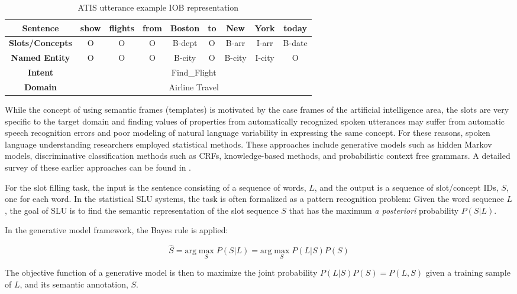 \begin{table}
\begin{tabular}{|c|c|c|c|c|c|c|c|c|}
\hline
{\bf Sentence} & show & flights & from & Boston & to & New & York & today \\
\hline
{\bf Slots/Concepts} & O & O & O & B-dept & O & B-arr & I-arr & B-date \\
\hline
{\bf Named Entity} & O & O & O & B-city & O & B-city & I-city & O \\
\hline
{\bf Intent} & \multicolumn{8}{c|}{Find\_Flight} \\
\hline
{\bf Domain} & \multicolumn{8}{c|}{Airline Travel} \\
\hline
\end{tabular}
\caption[IOB representation]{ATIS utterance example IOB representation}
\label{fig:iob}
\end{table}

While the concept of using semantic frames (templates) is motivated by the case
frames of the artificial intelligence area, the slots are very specific to the
target domain and finding values of properties from automatically recognized
spoken utterances may suffer from automatic speech recognition errors and poor
modeling of natural language variability in expressing the same concept. For
these reasons, spoken language understanding researchers employed statistical
methods. These approaches include generative models such as hidden Markov
models, discriminative classification methods such as CRFs, knowledge-based
methods, and probabilistic context free grammars. A detailed survey of these
earlier approaches can be found in \citep{rnn7}.

For the slot filling task, the input is the sentence consisting of a sequence
of words, $L$, and the output is a sequence of slot/concept IDs, $S$, one for each
word. In the statistical SLU systems, the task is often formalized as a pattern
recognition problem:  Given the word sequence $L$, the goal of SLU is to find the
semantic representation of the slot sequence $S$ that has the maximum {\it a
posteriori} probability $P(S | L)$. 

In the generative model framework, the Bayes rule is applied:

\begin{equation}
\hat{S} = \textrm{arg}\max_{S} P(S\vert L) = \textrm{arg}\max_{S} P(L \vert S) P (S)
\end{equation}

The objective function of a generative model is then to maximize the joint
probability $P(L | S)P(S) = P(L, S)$ given a training sample of $L$, and its semantic
annotation, $S$.

